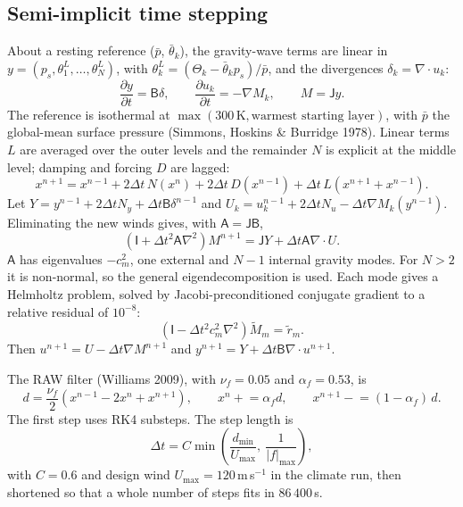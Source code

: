 \documentclass[11pt,a4paper]{article}
\newcommand{\pd}[2]{\frac{\partial #1}{\partial #2}}
\begin{document}
\subsection{Semi-implicit time stepping}
About a resting reference ($\bar p$, $\bar\theta_k$), the gravity-wave terms are
linear in $y = (p_s, \theta_1^L,\dots,\theta_N^L)$, with
$\theta_k^L = (\Theta_k - \bar\theta_k p_s)/\bar p$, and the divergences
$\delta_k = \nabla\cdot u_k$:
\begin{equation}
\pd{y}{t} = \mathsf{B}\delta, \qquad \pd{u_k}{t} = -\nabla M_k, \qquad M = \mathsf{J}y .
\end{equation}
The reference is isothermal at $\max(300\,\mathrm{K}, \text{warmest starting layer})$,
with $\bar p$ the global-mean surface pressure (Simmons, Hoskins \& Burridge 1978).
Linear terms $L$ are averaged over the outer levels and the remainder $N$ is
explicit at the middle level; damping and forcing $D$ are lagged:
\begin{equation}
x^{n+1} = x^{n-1} + 2\Delta t\,N(x^n) + 2\Delta t\,D(x^{n-1})
   + \Delta t\,L(x^{n+1} + x^{n-1}).
\end{equation}
Let $Y = y^{n-1} + 2\Delta t N_y + \Delta t\mathsf{B}\delta^{n-1}$ and
$U_k = u_k^{n-1} + 2\Delta t N_u - \Delta t\nabla M_k(y^{n-1})$. Eliminating the
new winds gives, with $\mathsf{A} = \mathsf{JB}$,
\begin{equation}
\left(\mathsf{I} + \Delta t^2\mathsf{A}\nabla^2\right)M^{n+1}
   = \mathsf{J}Y + \Delta t\mathsf{A}\nabla\cdot U .
\end{equation}
$\mathsf{A}$ has eigenvalues $-c_m^2$, one external and $N-1$ internal gravity
modes. For $N>2$ it is non-normal, so the general eigendecomposition is used. Each
mode gives a Helmholtz problem, solved by Jacobi-preconditioned conjugate gradient
to a relative residual of $10^{-8}$:
\begin{equation}
\left(\mathsf{I} - \Delta t^2 c_m^2\nabla^2\right)\tilde M_m = \tilde r_m .
\end{equation}
Then $u^{n+1} = U - \Delta t\nabla M^{n+1}$ and
$y^{n+1} = Y + \Delta t\mathsf{B}\nabla\cdot u^{n+1}$.

The RAW filter (Williams 2009), with $\nu_f = 0.05$ and $\alpha_f = 0.53$, is
\begin{equation}
d = \frac{\nu_f}{2}\left(x^{n-1} - 2x^n + x^{n+1}\right), \qquad
x^n \mathrel{+}= \alpha_f d, \qquad x^{n+1} \mathrel{-}= (1-\alpha_f)\,d .
\end{equation}
The first step uses RK4 substeps. The step length is
\begin{equation}
\Delta t = C\min\!\left(\frac{d_{\min}}{U_{\max}},\ \frac{1}{|f|_{\max}}\right),
\end{equation}
with $C = 0.6$ and design wind $U_{\max} = 120$\,m\,s$^{-1}$ in the climate run,
then shortened so that a whole number of steps fits in $86\,400$\,s.
\end{document}
